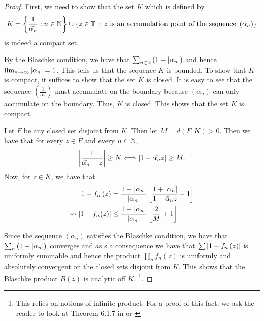 \begin{proof}
    First, we need to show that the set $K$ which is defined by
    \begin{equation*}
	K= \left\{ \frac{1}{\bar{\alpha_{n}}} : n \in \mathbb N \right\} \cup \left\{ z \in \mathbb T \, : \, z \text{ is an accumulation point of the sequence } \left( \alpha_{n} \right) \right\}
    \end{equation*}
    is indeed a compact set.

    By the Blaschke condition, we have that $\sum_{n \in \mathbb N} \left( 1- \left\lvert \alpha_{n} \right\rvert \right)$ and hence $\lim_{n\to \infty} \left\lvert \alpha_{n} \right\rvert = 1$. This tells us that the sequence $K$ is bounded. To show that $K$ is compact, it suffices to show that the set $K$ is closed. It is easy to see that the sequence $\left( \frac{1}{\bar{\alpha_{n}}} \right)$ must accumulate on the boundary because $\left( \alpha_{n} \right)$ can only accumulate on the boundary. Thus, $K$ is closed. This shows that the set $K$ is compact.

    Let $F$ be any closed set disjoint from $K$. Then let $M= d\left( F,K \right) > 0$. Then we have that for every $z\in F$ and every $n\in\mathbb N$, 
    \begin{equation*}
	\left\lvert \frac{1}{\bar{\alpha_{n}}-z} \right\rvert \ge N \Longleftrightarrow \left\lvert 1-\bar{\alpha_{n}}z \right\rvert \ge M.
    \end{equation*}
    Now, for $z\in K$, we have that
    \begin{align*}
	1-f_{n}\left( z \right) &= \frac{1-\left\lvert \alpha_{n} \right\rvert}{\left\lvert \alpha_{n} \right\rvert} \left[ \frac{1+\left\lvert \alpha_{n} \right\rvert}{1-\bar{\alpha}_{n}z} -1 \right] \\
	\leadsto \left\lvert 1-f_{n}(z) \right\rvert &\le \frac{1-\left\lvert \alpha_{n} \right\rvert}{\left\lvert \alpha_{n} \right\rvert} \left[ \frac{2}{M} + 1 \right]
    \end{align*}

    Since the sequence $\left( \alpha_{n} \right)$ satisfies the Blaschke condition, we have that $\sum_{n} \left( 1- \left\lvert \alpha_{n} \right\rvert \right)$ converges and as s a consequence we have that $\sum \left\lvert 1-f_{n}\left( z \right) \right\rvert$ is uniformly summable and hence the product $\prod_{n} f_{n} \left( z \right)$ is uniformly and absolutely convergent on the closed sets disjoint from $K$. This shows that the Blaschke product $B\left( z \right)$ is analytic off $K$. \footnote{This relies on notions of infinite product. For a proof of this fact, we ask the reader to look at Theorem 6.1.7 in \cite{ash2014complex} or \cite{rudin1987real}}. 
\end{proof}

